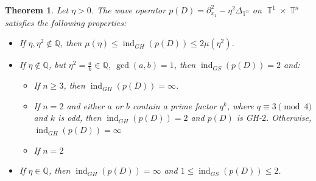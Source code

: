 \documentclass[11pt]{amsart}
\numberwithin{equation}{section}
\newtheorem{theorem}{Theorem}[section]
\theoremstyle{definition}
\DeclareMathOperator{\T}{\mathbb{T}}
\begin{document}
\begin{theorem}\label{theo-wave-n+1}
    Let $\eta >0$. The wave operator $p(D)=\partial_{x_1}^2-\eta^2\Delta_{\T^n}$ on $\T^1\times\T^n$ satisfies the following properties:
    \begin{itemize}
        \item[{\it (i)}] If $\eta,\eta^2\not\in\mathbb{Q}$, then 
        $\mu(\eta)\leq \operatorname{ind}_{GH}(p(D))\leq 2\mu(\eta^2)$. 
        \item[{\it (ii)}] If $\eta\not\in\mathbb{Q}$, but $\eta^2=\frac{a}{b}\in\mathbb{Q}$, $\gcd(a,b)=1$, then $\operatorname{ind}_{GS}(p(D))=2$ and: 
        \begin{itemize}
            \item If $n\geq 3$, then  $\operatorname{ind}_{GH}(p(D))=\infty$.
            \item If $n=2$ and either $a$ or $b$ contain a prime factor $q^k$, where $q\equiv 3 \pmod{4}$ and $k$ is odd, then $\operatorname{ind}_{GH}(p(D))=2$ and $p(D)$ is GH-$2$. Otherwise, $\operatorname{ind}_{GH}(p(D))=\infty$
            \item If $n=2$
        \end{itemize}
          \item[{\it (iii)}] If $\eta\in\mathbb{Q}$, then $\operatorname{ind}_{GH}(p(D))=\infty$ and $1\leq\operatorname{ind}_{GS}(p(D))\leq 2$.
    \end{itemize}
\end{theorem}
\end{document}
